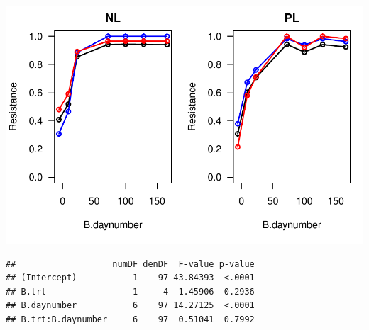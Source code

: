 \documentclass[]{article}
\begin{document}
\includegraphics{analysis_ecoevostoich_files/figure-latex/unnamed-chunk-27-1.pdf}

\begin{verbatim}
##                   numDF denDF  F-value p-value
## (Intercept)           1    97 43.84393  <.0001
## B.trt                 1     4  1.45906  0.2936
## B.daynumber           6    97 14.27125  <.0001
## B.trt:B.daynumber     6    97  0.51041  0.7992
\end{verbatim}
\end{document}
